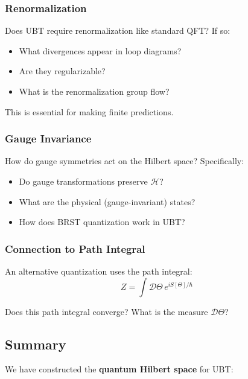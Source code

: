 \subsubsection{Renormalization}

Does UBT require renormalization like standard QFT? If so:
\begin{itemize}
\item What divergences appear in loop diagrams?
\item Are they regularizable?
\item What is the renormalization group flow?
\end{itemize}

This is essential for making finite predictions.

\subsubsection{Gauge Invariance}

How do gauge symmetries act on the Hilbert space? Specifically:
\begin{itemize}
\item Do gauge transformations preserve $\mathcal{H}$?
\item What are the physical (gauge-invariant) states?
\item How does BRST quantization work in UBT?
\end{itemize}

\subsubsection{Connection to Path Integral}

An alternative quantization uses the path integral:
\begin{equation}
Z = \int \mathcal{D}\Theta \, e^{iS[\Theta]/\hbar}
\end{equation}

Does this path integral converge? What is the measure $\mathcal{D}\Theta$?

\subsection{Summary}

We have constructed the \textbf{quantum Hilbert space} for UBT:

